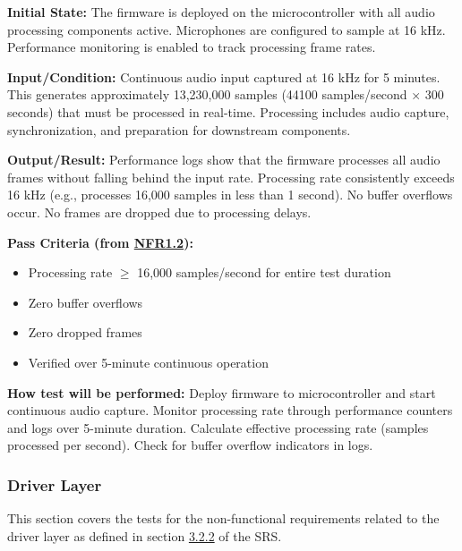 \documentclass[12pt, titlepage]{article}
\begin{document}
\begin{enumerate}
\textbf{Initial State:} 
The firmware is deployed on the microcontroller with all audio processing
components active. Microphones are configured to sample at 16 kHz. Performance
monitoring is enabled to track processing frame rates.
					
\textbf{Input/Condition:} 
Continuous audio input captured at 16 kHz for 5 minutes. This generates
approximately 13,230,000 samples (44100 samples/second × 300 seconds) that must
be processed in real-time. Processing includes audio capture, synchronization,
and preparation for downstream components.
					
\textbf{Output/Result:} 
Performance logs show that the firmware processes all audio frames without
falling behind the input rate. Processing rate consistently exceeds 16 kHz
(e.g., processes 16,000 samples in less than 1 second). No buffer overflows
occur. No frames are dropped due to processing delays.

\textbf{Pass Criteria (from \hyperref[SRS-NFR1_2]{NFR1.2}):}
\begin{itemize}
\item Processing rate $\geq$ 16,000 samples/second for entire test duration
\item Zero buffer overflows
\item Zero dropped frames
\item Verified over 5-minute continuous operation
\end{itemize}
					
\textbf{How test will be performed:} 
Deploy firmware to microcontroller and start continuous audio capture. Monitor
processing rate through performance counters and logs over 5-minute duration.
Calculate effective processing rate (samples processed per second). Check for
buffer overflow indicators in logs. 

\end{enumerate}

\subsubsection{Driver Layer}

This section covers the tests for the non-functional requirements related to the
driver layer as defined in section \hyperref[SRS-sec:FR2]{3.2.2} of the SRS.
\end{document}
